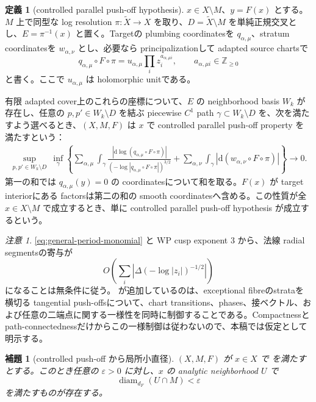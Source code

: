 \documentclass[11pt,a4paper]{ltjsarticle}
\newcommand{\ZZ}{\mathbb Z}
\newcommand{\dd}{\mathrm d}
\newcommand{\diam}{\operatorname{diam}}
\theoremstyle{plain}
\newtheorem{lemma}[lemma]{補題}
\theoremstyle{definition}
\newtheorem{definition}[definition]{定義}
\theoremstyle{remark}
\newtheorem{remark}[remark]{注意}
\begin{document}
\begin{definition}[controlled parallel push-off hypothesis]
\label{hyp:controlled-pushoff}
$x\in X\setminus M$、$y=F(x)$ とする。$M$ 上で同型な log resolution
$\pi:\widetilde X\to X$ を取り、$D=\widetilde X\setminus M$ を単純正規交叉とし、$E=\pi^{-1}(x)$ と置く。Targetの plumbing coordinatesを $q_{\alpha,\mu}$、stratum coordinatesを $w_{\alpha,\nu}$ とし、必要なら principalizationして adapted source chartsで
\begin{equation}
\label{eq:general-period-monomial}
 q_{\alpha,\mu}\circ F\circ\pi
 =u_{\alpha,\mu}\prod_i z_i^{a_{\alpha,\mu i}},
 \qquad a_{\alpha,\mu i}\in\ZZ_{\ge0}
\end{equation}
と書く。ここで $u_{\alpha,\mu}$ は holomorphic unitである。

有限 adapted cover上のこれらの座標について、$E$ の neighborhood basis $W_k$ が存在し、任意の $p,p'\in W_k\setminus D$ を結ぶ piecewise $C^1$ path $\gamma\subset W_k\setminus D$ を、次を満たすよう選べるとき、$(X,M,F)$ は $x$ で controlled parallel push-off property を満たすという：
\begin{multline}
\label{eq:controlled-pushoff-estimate}
 \sup_{p,p'\in W_k\setminus D}\ \inf_\gamma
 \left\{
 \sum_{\alpha,\mu}
 \int_\gamma
 \frac{|\dd\log(q_{\alpha,\mu}\circ F\circ\pi)|}
 {(-\log|q_{\alpha,\mu}\circ F\circ\pi|)^{3/2}}
 +\sum_{\alpha,\nu}\int_\gamma
 |\dd(w_{\alpha,\nu}\circ F\circ\pi)|
 \right\}
 \longrightarrow0.
\end{multline}
第一の和では $q_{\alpha,\mu}(y)=0$ の coordinatesについて和を取る。$F(x)$ が target interiorにある factorsは第二の和の smooth coordinatesへ含める。この性質が全 $x\in X\setminus M$ で成立するとき、単に controlled parallel push-off hypothesis が成立するという。
\end{definition}

\begin{remark}
\eqref{eq:general-period-monomial} と WP cusp exponent $3$ から、法線 radial segmentsの寄与が
\[
 O\!\left(\sum_i\left|\Delta(-\log|z_i|)^{-1/2}\right|\right)
\]
になることは無条件に従う。 が追加しているのは、exceptional fibreのstrataを横切る tangential push-offsについて、chart transitions、phases、接ベクトル、および任意の二端点に関する一様性を同時に制御することである。Compactnessとpath-connectednessだけからこの一様制御は従わないので、本稿では仮定として明示する。
\end{remark}

\begin{lemma}[controlled push-off から局所小直径]
\label{lem:finite-wp-local-collapse}
$(X,M,F)$ が $x\in X$ で  を満たすとする。このとき任意の $\varepsilon>0$ に対し、$x$ の analytic neighborhood $U$ で
\[
 \diam_{d_F}(U\cap M)<\varepsilon
\]
を満たすものが存在する。
\end{lemma}
\end{document}
